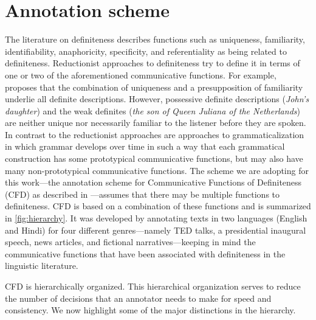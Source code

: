 \documentclass[11pt,letterpaper]{article}
\newcommand{\ensuretext}[1]{#1}
\newcommand{\nssmarker}{\ensuretext{\textcolor{magenta}{\ensuremath{^{\textsc{NS}}_{\textsc{S}}}}}}
\newcommand{\abmarker}{\ensuretext{\textcolor{red}{\ensuremath{^{\textsc{A}}_{\textsc{B}}}}}}
\newcommand{\arkcomment}[3]{\ensuretext{\textcolor{#3}{[#1 #2]}}}
\newcommand{\nss}[1]{\arkcomment{\nssmarker}{#1}{magenta}}
\newcommand{\ab}[1]{\arkcomment{\abmarker}{#1}{red}}
\begin{document}

\section{Annotation scheme}\label{sec:scheme}

The literature on definiteness describes functions such as 
uniqueness, familiarity, identifiability, anaphoricity, specificity, and 
referentiality \citep[\textit{inter alia}]{birner94,condoravdi92,evans77,evans80,gundel88,gundel93,heim90,kadmon87,kadmon90,lyons99,prince92,roberts03,russell05} as being related to definiteness. Reductionist approaches to definiteness try to define it in terms of one or two of the aforementioned communicative functions.   
For example, \citet{roberts03} proposes that the combination of uniqueness and a presupposition of familiarity 
underlie all definite descriptions.  However, possessive definite descriptions ({\it John's daughter}) 
and the weak definites ({\it the son of Queen Juliana of the Netherlands}) are neither unique nor necessarily 
familiar to the listener before they are spoken. In contrast to the reductionist approaches are approaches to grammaticalization~\citep{hopper-03} in which grammar develops over time in such a way that 
each grammatical construction has some prototypical communicative functions, 
but may also have many non-prototypical communicative functions. The scheme we are adopting for this work---the annotation scheme for Communicative Functions of Definiteness (CFD) as described in \citet{bhatia14}---assumes that there may be multiple functions to definiteness. CFD is based on a combination of these functions and is summarized in \cref{fig:hierarchy}. It was developed by annotating texts in two languages (English and Hindi) for four different genres---namely TED talks, a presidential inaugural speech, news articles, and fictional narratives---keeping in mind the communicative functions that have been associated with definiteness in the linguistic literature. 

CFD is hierarchically organized. This hierarchical organization serves to reduce the number of decisions that an annotator needs to make for speed and consistency. 
We now highlight some of the major distinctions in the hierarchy.
\end{document}
